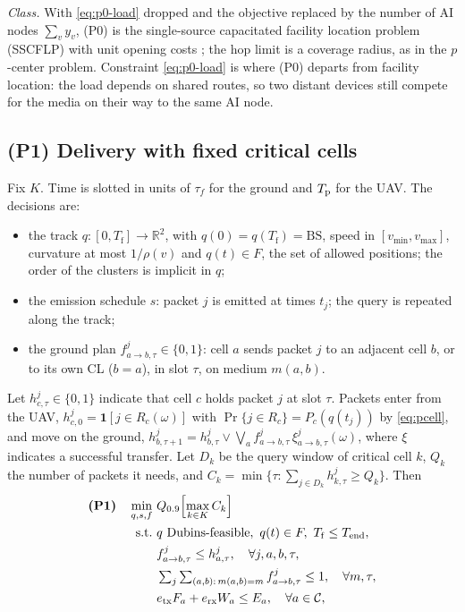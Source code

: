 \emph{Class.} With \eqref{eq:p0-load} dropped and the objective replaced by the number of AI nodes $\sum_v y_v$,
(P0) is the single-source capacitated facility location problem (SSCFLP) with unit opening costs
\cite{bakker2025}; the hop limit is a coverage radius, as in the $p$-center problem. Constraint \eqref{eq:p0-load} is
where (P0) departs from facility location: the load depends on shared routes, so two distant devices still compete for
the media on their way to the same AI node.

\subsection{(P1) Delivery with fixed critical cells}
Fix $K$. Time is slotted in units of $\tau_f$ for the ground and $T_{\mathrm p}$ for the UAV. The decisions are:
\begin{itemize}
\item the track $q:[0,T_{\mathrm f}]\to\mathbb R^2$, with $q(0)=q(T_{\mathrm f})=\mathrm{BS}$, speed in
$[v_{\min},v_{\max}]$, curvature at most $1/\rho(v)$ and $q(t)\in F$, the set of allowed positions; the order of the
clusters is implicit in $q$;
\item the emission schedule $s$: packet $j$ is emitted at times $t_j$; the query is repeated along the track;
\item the ground plan $f^{j}_{a\to b,\tau}\in\{0,1\}$: cell $a$ sends packet $j$ to an adjacent cell $b$, or to its own
CL ($b=a$), in slot $\tau$, on medium $m(a,b)$.
\end{itemize}
Let $h^j_{c,\tau}\in\{0,1\}$ indicate that cell $c$ holds packet $j$ at slot $\tau$. Packets enter from the UAV,
$h^j_{c,0}=\mathbf 1[j\in R_c(\omega)]$ with $\Pr\{j\in R_c\}=P_c(q(t_j))$ by \eqref{eq:pcell}, and move on the ground,
$h^j_{b,\tau+1}=h^j_{b,\tau}\lor\bigvee_a f^j_{a\to b,\tau}\,\xi^j_{a\to b,\tau}(\omega)$, where $\xi$ indicates a
successful transfer. Let $D_k$ be the query window of critical cell $k$, $Q_k$ the number of packets it needs, and
$C_k=\min\{\tau:\sum_{j\in D_k}h^j_{k,\tau}\ge Q_k\}$. Then
\begin{subequations}\label{eq:p1}
\begin{align}
\textbf{(P1)}\quad \min_{q,s,f}\ & Q_{0.9}\Bigl[\max_{k\in K} C_k\Bigr]\label{eq:p1-obj}\\
\text{s.t.}\ & q \text{ Dubins-feasible},\ q(t)\in F,\ T_{\mathrm f}\le T_{\mathrm{end}},\label{eq:p1-fly}\\
& f^j_{a\to b,\tau}\le h^j_{a,\tau},\quad \forall j,a,b,\tau,\label{eq:p1-causal}\\
& \textstyle\sum_{j}\sum_{(a,b):\,m(a,b)=m} f^j_{a\to b,\tau}\le 1,\quad \forall m,\tau,\label{eq:p1-medium}\\
& e_{\mathrm{tx}}F_a+e_{\mathrm{rx}}W_a\le E_a,\quad \forall a\in\mathcal C,\label{eq:p1-energy}
\end{align}
\end{subequations}
